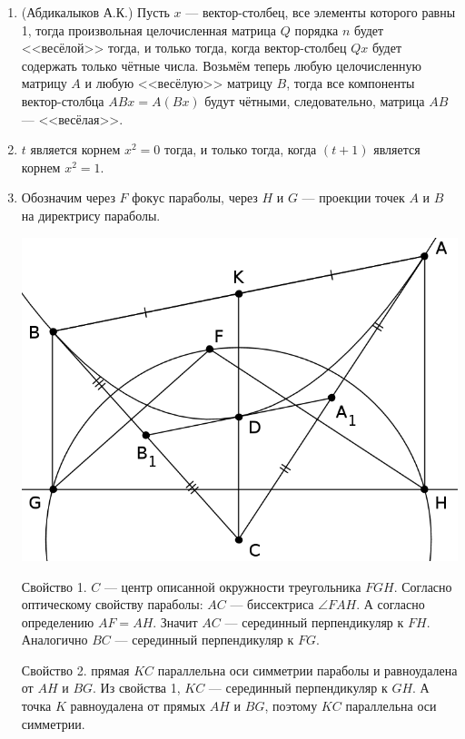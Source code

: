 \begin{enumerate}

\item (Абдикалыков А.К.) Пусть $x$ --- вектор-столбец, все элементы которого равны 1, тогда произвольная целочисленная матрица $Q$ порядка $n$ будет <<весёлой>> тогда, и только тогда, когда вектор-столбец $Qx$ будет содержать только чётные числа. Возьмём теперь любую целочисленную матрицу $A$ и любую <<весёлую>> матрицу $B$, тогда все компоненты вектор-столбца $ABx=A(Bx)$ будут чётными, следовательно, матрица $AB$ --- <<весёлая>>.

\item $t$ является корнем $x^2 = 0$ тогда, и только тогда, когда $(t+1)$ является корнем $x^2 = 1$.

\item Обозначим через $F$ фокус параболы, через $H$ и $G$ --- проекции точек $A$ и $B$ на директрису параболы.

\begin{center}
%
\includegraphics{solution/pictures/2012-2013-3}
\end{center}

Свойство 1. $C$ --- центр описанной окружности треугольника $FGH$. Согласно оптическому свойству параболы: $AC$ --- биссектриса $\angle FAH$. А согласно определению $AF = AH$. Значит $AC$ --- серединный перпендикуляр к $FH$. Аналогично $BC$ --- серединный перпендикуляр к $FG$. 

Свойство 2. прямая $KC$ параллельна оси симметрии параболы и равноудалена от $AH$ и $BG$. Из свойства 1, $KC$ --- серединный перпендикуляр к $GH$. А точка $K$ равноудалена от прямых $AH$ и $BG$, поэтому $KC$ параллельна оси симметрии.


\end{enumerate}
